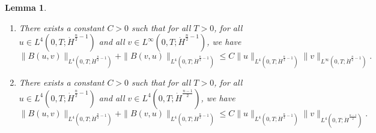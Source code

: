 \documentclass[a4paper, 12pt]{article}
\theoremstyle{plain}
\newtheorem{lemma}[proposition]{Lemma}
\theoremstyle{definition}
\theoremstyle{remark}
\numberwithin{equation}{section}
\begin{document}
\begin{lemma}
\label{lem:propB}
\begin{enumerate}
\item
There exists a constant $C>0$ such that for all $T>0$, for all $u\in L^4(0,T;\dot H^{\frac{n}{2}-1})$ and
all $v\in L^\infty(0,T;\dot H^{\frac{n}{2}-1})$, we have
%
\begin{equation}
\label{eq:BLnLn}
\|B(u,v)\|_{L^4(0,T;\dot H^{\frac{n}{2}-1})}+\|B(v,u)\|_{L^4(0,T;\dot H^{\frac{n}{2}-1})}\le 
C\|u\|_{L^4(0,T;\dot H^{\frac{n}{2}-1})}\|v\|_{L^\infty(0,T;\dot H^{\frac{n}{2}-1})}.
\end{equation}
%
\item
There exists a constant $C>0$ such that for all $T>0$, for all $u\in L^4(0,T;\dot H^{\frac{n}{2}-1})$ and
all $v\in L^4(0,T;\dot H^{\frac{n-1}{2}})$, we have
%
\begin{equation}
\label{eq:BLnL2n}
\|B(u,v)\|_{L^4(0,T;\dot H^{\frac{n}{2}-1})}+\|B(v,u)\|_{L^4(0,T;\dot H^{\frac{n}{2}-1})}
\le C\|u\|_{L^4(0,T;\dot H^{\frac{n}{2}-1})}\|v\|_{L^4(0,T;\dot H^{\frac{n-1}{2}})}.
\end{equation}
%
\end{enumerate}
\end{lemma}
\end{document}
